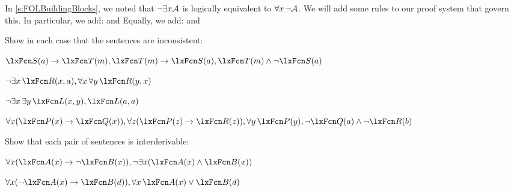 In \cref{s:FOLBuildingBlocks}, we noted that $\neg\exists x\mathcal{A}$ is logically equivalent to $\forall x\, \neg\mathcal{A}$. We will add some rules to our proof system that govern this. In particular, we add:
and
Equally, we add:
and

\practiceproblems
\problempart
Show in each case that the sentences are inconsistent:
\begin{compactlist}
\item $\atom{S}{a}\eif \atom{T}{m}, \atom{T}{m} \eif \atom{S}{a}, \atom{T}{m} \eand \enot \atom{S}{a}$
\item $\enot\exists x\,\atom{R}{x,a}, \forall x\, \forall y\,\atom{R}{y,x}$
\item $\enot\exists x\, \exists y\,\atom{L}{x,y}, \atom{L}{a,a}$
\item $\forall x(\atom{P}{x} \eif \atom{Q}{x}), \forall z(\atom{P}{z} \eif \atom{R}{z}), \forall y\,\atom{P}{y}, \enot \atom{Q}{a} \eand \enot \atom{R}{b}$
\end{compactlist}

\problempart
Show that each pair of sentences is interderivable:
\begin{compactlist}
\item $\forall x (\atom{A}{x}\eif \enot \atom{B}{x}), \enot\exists x(\atom{A}{x} \eand \atom{B}{x})$
\item $\forall x (\enot\atom{A}{x}\eif \atom{B}{d}), \forall x\,\atom{A}{x} \eor \atom{B}{d}$
\end{compactlist}

